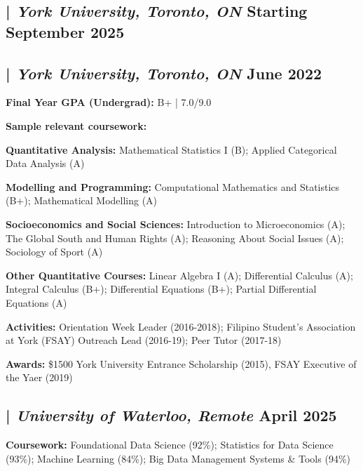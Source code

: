 
\subsection{ | \textit{York University, Toronto, ON}	\hfill Starting September 2025}
\subsection{ | \textit{York University, Toronto, ON} \hfill	June 2022}
\begin{zitemize}
\item \textbf{Final Year GPA (Undergrad):} B+ | 7.0/9.0
\item \textbf{Sample relevant coursework:}
\begin{zitemize}
\item \textbf{Quantitative Analysis:} Mathematical Statistics I (B); Applied Categorical Data Analysis (A)
\item \textbf{Modelling and Programming:} Computational Mathematics and Statistics (B+); Mathematical Modelling (A)
\item \textbf{Socioeconomics and Social Sciences:} Introduction to Microeconomics (A); The Global South and Human Rights (A); Reasoning About Social Issues (A); Sociology of Sport (A)  
\item \textbf{Other Quantitative Courses:} Linear Algebra I (A); Differential Calculus (A); Integral Calculus (B+); Differential Equations (B+); Partial Differential Equations (A)
\end{zitemize}
\item \textbf{Activities:} Orientation Week Leader (2016-2018); Filipino Student’s Association at York (FSAY) Outreach Lead (2016-19); Peer Tutor (2017-18)
\item \textbf{Awards:}  \$1500 York University Entrance Scholarship (2015), FSAY Executive of the Yaer (2019)
\end{zitemize}
\vfill
\subsection{ | \textit{University of Waterloo, Remote} \hfill	April 2025}
\begin{zitemize}
\item \textbf{Coursework:}  Foundational Data Science (92\%); Statistics for Data Science (93\%); Machine Learning (84\%); Big Data Management Systems \& Tools (94\%)
\end{zitemize}



